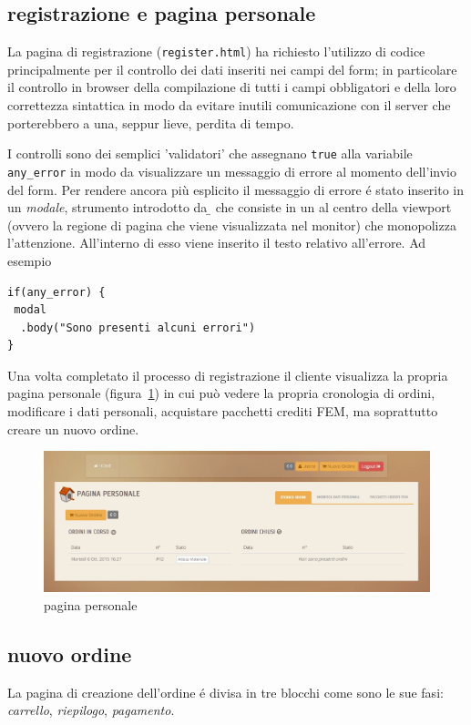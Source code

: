 \subsection*{registrazione e pagina personale}
\label{subs:preg-ppers}
La pagina di registrazione (\texttt{register.html}) ha richiesto l'utilizzo di codice {\js} principalmente per il controllo dei dati inseriti nei campi del form; in particolare il controllo in browser della compilazione di tutti i campi obbligatori e della loro correttezza sintattica in modo da evitare inutili comunicazione con il server che porterebbero a una, seppur lieve, perdita di tempo.

I controlli sono dei semplici 'validatori' che assegnano \texttt{true} alla variabile \texttt{any\_error} in modo da visualizzare un messaggio di errore al momento dell'invio del form. Per rendere ancora più esplicito il messaggio di errore é stato inserito in un \emph{modale}, strumento introdotto da {\b} che consiste in un  al centro della viewport (ovvero la regione di pagina che viene visualizzata nel monitor) che monopolizza l'attenzione. All'interno di esso viene inserito il testo relativo all'errore. Ad esempio
\begin{verbatim}
if(any_error) {
 modal
  .body("Sono presenti alcuni errori")
}
\end{verbatim}

Una volta completato il processo di registrazione il cliente visualizza la propria pagina personale (figura~\ref{fig:ppersonale}) in cui può vedere la propria cronologia di ordini, modificare i dati personali, acquistare pacchetti crediti FEM, ma soprattutto creare un nuovo ordine.

\begin{figure}
 \includegraphics[width=1\textwidth]{images/ppersonale} 
 \caption{pagina personale}
 \label{fig:ppersonale}
\end{figure}

\subsection*{nuovo ordine}
\label{subs:pno}
La pagina di creazione dell'ordine é divisa in tre blocchi come sono le sue fasi: \emph{carrello}, \emph{riepilogo}, \emph{pagamento}.

